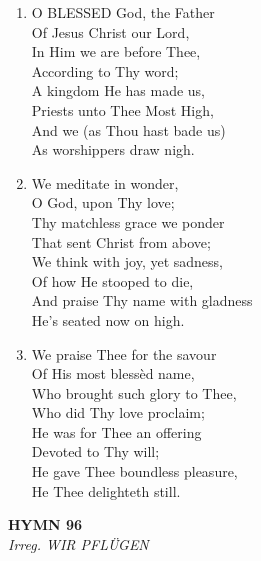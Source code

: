\documentclass[11pt,a4paper]{article}
\begin{document}
\begin{enumerate}
    \item O BLESSED God, the Father \\
        Of Jesus Christ our Lord, \\
        In Him we are before Thee, \\
        According to Thy word; \\
        A kingdom He has made us, \\
        Priests unto Thee Most High, \\
        And we (as Thou hast bade us) \\
        As worshippers draw nigh.

    \item We meditate in wonder, \\
        O God, upon Thy love; \\
        Thy matchless grace we ponder \\
        That sent Christ from above; \\
        We think with joy, yet sadness, \\
        Of how He stooped to die, \\
        And praise Thy name with gladness \\
        He's seated now on high.

    \item We praise Thee for the savour \\
        Of His most bless\`ed name, \\
        Who brought such glory to Thee, \\
        Who did Thy love proclaim; \\
        He was for Thee an offering \\
        Devoted to Thy will; \\
        He gave Thee boundless pleasure, \\
        He Thee delighteth still.

\end{enumerate}

\newpage
\begin{center}
    {\Large \textbf{HYMN 96\textdagger{}}}
    \\
    \textit{Irreg. WIR PFL\"{U}GEN}
\end{center}
\vspace{1em}
\end{document}
